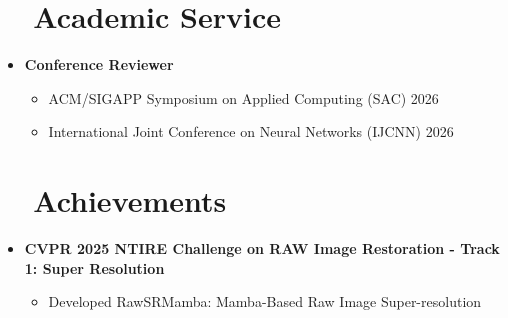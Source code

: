 \documentclass[a4paper,11pt]{article}
\makeatletter
\newcommand{\resumeSubheading}[4]{
  \vspace{-2pt}\item
    \begin{tabular*}{0.97\textwidth}[t]{l@{\extracolsep{\fill}}r}
      \textbf{#1} & \textbf{#2} \\
      \textit{\small#3} & \textit{\small #4} \\
    \end{tabular*}\vspace{-7pt}
}
\newcommand{\resumeSubHeadingListStart}{\begin{itemize}[leftmargin=0.15in, label={}]}
\newcommand{\resumeSubHeadingListEnd}{\end{itemize}}
\makeatother
\begin{document}
\vspace{0.25cm}
\section{\faComments\ \ Academic Service}
  \resumeSubHeadingListStart
  \vspace{0.25cm}
    \item \textbf{Conference Reviewer}
    \begin{itemize}[leftmargin=0.3in]
        \item ACM/SIGAPP Symposium on Applied Computing (SAC) 2026
        \item International Joint Conference on Neural Networks (IJCNN) 2026
    \end{itemize}
  \resumeSubHeadingListEnd


\vspace{0.25cm}
\section{\faTrophy\ \ Achievements}
  \resumeSubHeadingListStart
  \vspace{0.25cm}
    \item \textbf{CVPR 2025 NTIRE Challenge on RAW Image Restoration - Track 1: Super Resolution}
    \begin{itemize}[leftmargin=0.3in]
        \item Developed RawSRMamba: Mamba-Based Raw Image Super-resolution
    \end{itemize}
  \resumeSubHeadingListEnd
\end{document}
